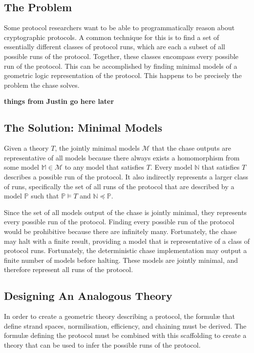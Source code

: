 	\subsection{The Problem}

		Some protocol researchers want to be able to programmatically reason
		about cryptographic protocols. A common technique for this is to find a
		set of essentially different classes of protocol runs, which are each a
		subset of all possible runs of the protocol. Together, these classes
		encompass every possible run of the protocol. This can be accomplished
		by finding minimal models of a geometric logic representation of the
		protocol. This happens to be precisely the problem the chase solves.

		\textbf{ things from Justin go here later }

	\subsection{The Solution: Minimal Models}

		Given a theory $T$, the jointly minimal models $\mathcal{M}$ that the
		chase outputs are representative of all models because there always
		exists a homomorphism from some model $\mathbb{M} \in \mathcal{M}$ to
		any model that satisfies $T$. Every model $\mathbb{N}$ that satisfies
		$T$ describes a possible run of the protocol. It also indirectly
		represents a larger class of runs, specifically the set of all runs of
		the protocol that are described by a model $\mathbb{P}$ such that
		$\mathbb{P} \models T$ and $\mathbb{N} \preceq \mathbb{P}$.

		Since the set of all models output of the chase is jointly minimal,
		they represents every possible run of the protocol. Finding every
		possible run of the protocol would be prohibitive because there are
		infinitely many. Fortunately, the chase may halt with a finite result,
		providing a model that is representative of a class of protocol runs.
		Fortunately, the deterministic chase implementation may output a finite
		number of models before halting. These models are jointly minimal, and
		therefore represent all runs of the protocol.

	\subsection{Designing An Analogous Theory}

		In order to create a geometric theory describing a protocol, the
		formul{\ae} that define strand spaces, normilisation, efficiency, and
		chaining must be derived. The formul{\ae} defining the protocol must be
		combined with this scaffolding to create a theory that can be used to
		infer the possible runs of the protocol.

